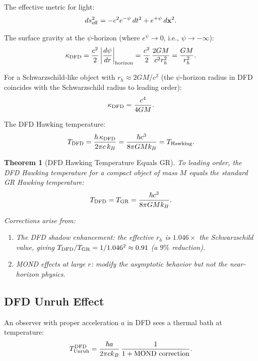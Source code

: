\documentclass[11pt,a4paper]{article}
\newtheorem{theorem}{Theorem}
\begin{document}
The effective metric for light:
\begin{equation}
ds^2_{\rm eff} = -c^2 e^{-\psi}\,dt^2 + e^{+\psi}\,d\mathbf{x}^2.
\end{equation}

The surface gravity at the $\psi$-horizon (where $e^\psi \to 0$, i.e., $\psi \to -\infty$):
\begin{equation}
\kappa_{\rm DFD} = \frac{c^2}{2}\left|\frac{d\psi}{dr}\right|_{\rm horizon}
= \frac{c^2}{2}\,\frac{2GM}{c^2 r_h^2} = \frac{GM}{r_h^2}.
\end{equation}

For a Schwarzschild-like object with $r_h \approx 2GM/c^2$ (the $\psi$-horizon radius in DFD coincides with the Schwarzschild radius to leading order):
\begin{equation}
\kappa_{\rm DFD} = \frac{c^4}{4GM}.
\end{equation}

The DFD Hawking temperature:
\begin{equation}
T_{\rm DFD} = \frac{\hbar\,\kappa_{\rm DFD}}{2\pi c\,k_B}
= \frac{\hbar c^3}{8\pi G M k_B} = T_{\rm Hawking}.
\end{equation}

\begin{theorem}[DFD Hawking Temperature Equals GR]
\label{thm:hawking}
To leading order, the DFD Hawking temperature for a compact object of mass $M$ equals the standard GR Hawking temperature:
\begin{equation}
T_{\rm DFD} = T_{\rm GR} = \frac{\hbar c^3}{8\pi G M k_B}.
\end{equation}

Corrections arise from:
\begin{enumerate}
\item The DFD shadow enhancement: the effective $r_h$ is $1.046\times$ the Schwarzschild value, giving $T_{\rm DFD}/T_{\rm GR} = 1/1.046^2 \approx 0.91$ (a $9\%$ reduction).
\item MOND effects at large $r$: modify the asymptotic behavior but not the near-horizon physics.
\end{enumerate}
\end{theorem}

\subsection{DFD Unruh Effect}
\label{sec:unruh}

An observer with proper acceleration $a$ in DFD sees a thermal bath at temperature:
\begin{equation}
T_{\rm Unruh}^{\rm DFD} = \frac{\hbar a}{2\pi c k_B}\,\frac{1}{1 + \text{MOND correction}}.
\end{equation}
\end{document}
